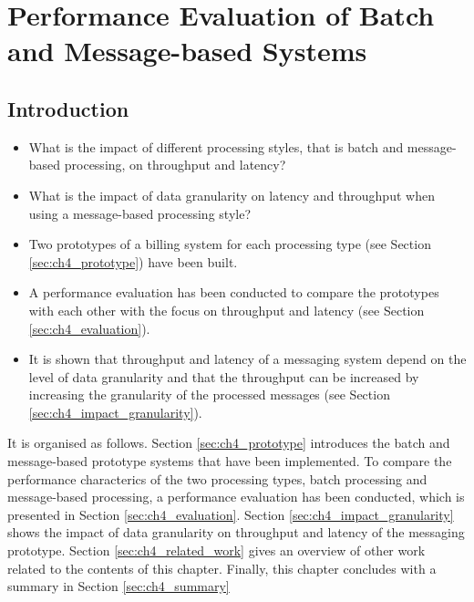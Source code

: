\chapter{Performance Evaluation of Batch and Message-based Systems}\label{ch:performance_evaluation}

\section{Introduction}\label{sec:ch4_introduction}

\begin{itemize}
  \item What is the impact of different processing styles, that is batch and message-based processing, on throughput and latency?
  \item What is the impact of data granularity on latency and throughput when using a message-based processing style?  
\end{itemize}



\begin{itemize}
	\item Two prototypes of a billing system for each processing type (see Section \ref{sec:ch4_prototype}) have been built. 
	\item A performance evaluation has been conducted to compare the prototypes with each other with the focus on throughput and latency (see Section \ref{sec:ch4_evaluation}).
	\item It is shown that throughput and latency of a messaging system depend on the level of data granularity and that the throughput can be increased by increasing the granularity of the processed messages (see Section \ref{sec:ch4_impact_granularity}).
\end{itemize}

It is organised as follows. Section \ref{sec:ch4_prototype} introduces the batch and message-based prototype systems that have been implemented. To compare the performance characterics of the two processing types, batch processing and message-based processing, a performance evaluation has been conducted, which is presented in Section \ref{sec:ch4_evaluation}. Section \ref{sec:ch4_impact_granularity} shows the impact of data granularity on throughput and latency of the messaging prototype. Section \ref{sec:ch4_related_work} gives an overview of other work related to the contents of this chapter. Finally, this chapter concludes with a summary in Section \ref{sec:ch4_summary} 


